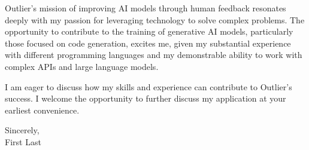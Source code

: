 Outlier's mission of improving AI models through human feedback
resonates deeply with my passion for leveraging technology to solve
complex problems. The opportunity to contribute to the training of
generative AI models, particularly those focused on code generation,
excites me, given my substantial experience with different programming
languages and my demonstrable ability to work with complex APIs and
large language models.

I am eager to discuss how my skills and experience can contribute to
Outlier's success. I welcome the opportunity to further discuss my
application at your earliest convenience.

Sincerely,\\
First Last
